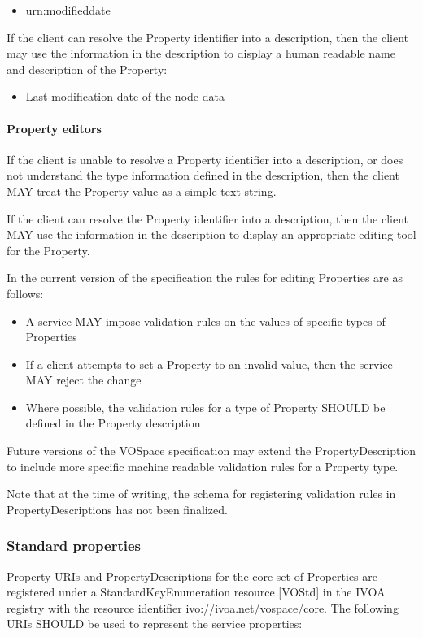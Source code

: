 \documentclass[11pt,a4paper]{ivoa}
\begin{document}
\begin{itemize}
    \item urn:modifieddate
\end{itemize}

If the client can resolve the Property identifier into a description, then the client may use the information in the description to display a human readable name and description of the Property:

\begin{itemize}
    \item Last modification date of the node data
\end{itemize}

\paragraph{Property editors}
If the client is unable to resolve a Property identifier into a description, or does not understand the type information defined in the description, then the client MAY treat the Property value as a simple text string.

If the client can resolve the Property identifier into a description, then the client MAY use the information in the description to display an appropriate editing tool for the Property.

In the current version of the specification the rules for editing Properties are as follows:

\begin{itemize}
    \item A service MAY impose validation rules on the values of specific types of Properties
    \item If a client attempts to set a Property to an invalid value, then the service MAY reject the change
    \item Where possible, the validation rules for a type of Property SHOULD be defined in the Property description
\end{itemize}

Future versions of the VOSpace specification may extend the PropertyDescription to include more specific machine readable validation rules for a Property type.

Note that at the time of writing, the schema for registering validation rules in PropertyDescriptions has not been finalized.

\subsubsection{Standard properties}
\label{subsubsec:standard properties}
Property URIs and PropertyDescriptions for the core set of Properties are registered under a StandardKeyEnumeration resource [VOStd] in the IVOA registry with the resource identifier ivo://ivoa.net/vospace/core. The following URIs SHOULD be used to represent the service properties:
\end{document}
